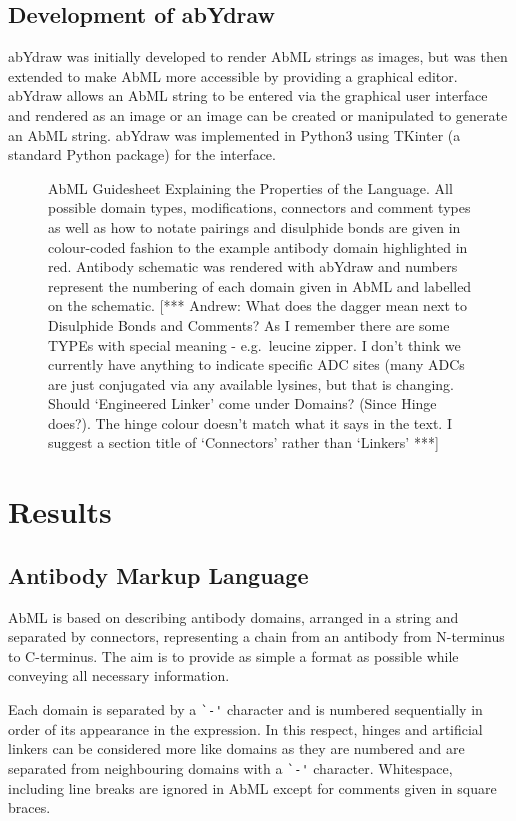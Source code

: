 \documentclass[a4]{article}
\newcommand{\andrew}[1]{{\color{red} [*** Andrew: #1 ***]}}
\begin{document}
\subsection{Development of abYdraw}
abYdraw was initially developed to render AbML strings as images, but
was then extended to make AbML more accessible by providing a
graphical editor. abYdraw allows an AbML string to be entered via
the graphical user interface and rendered as an image or an image can
be created or manipulated to generate an AbML string.
abYdraw was implemented in Python3 using TKinter (a standard Python
package) for the interface.


\begin{figure}
\caption{\label{fig:1} AbML Guidesheet Explaining the Properties of
the Language. All possible domain types, modifications, connectors and
comment types as well as how to notate pairings and disulphide bonds
are given in colour-coded fashion to the example antibody domain
highlighted in red. Antibody schematic was rendered with abYdraw and
numbers represent the numbering of each domain given in AbML and
labelled on the schematic. \andrew{What does the dagger mean next
  to Disulphide Bonds and Comments? As I remember there are some
  TYPEs with special meaning - e.g.\ leucine zipper. I don't think
  we currently have anything to indicate specific ADC sites (many
  ADCs are just conjugated via any available lysines, but that is
  changing. Should `Engineered Linker' come under Domains? (Since
  Hinge does?). The hinge colour doesn't match what it says in the
  text. I suggest a section title of `Connectors' rather than
  `Linkers'}}
\end{figure}

\section{Results}

\subsection{Antibody Markup Language}
AbML is based on describing antibody domains, arranged in a string and
separated by connectors, representing a chain from an antibody
from N-terminus to C-terminus. The aim is to provide as simple a format
as possible while conveying all necessary information.

Each domain is separated by a
\verb|`-'| character and is numbered sequentially in
order of its appearance in the expression. 
In this respect, hinges and artificial linkers can be considered more
like domains as they are numbered and are separated from neighbouring
domains with a \verb|`-'| character.
Whitespace, including line breaks are ignored in AbML
except for comments given in square braces.
\end{document}
